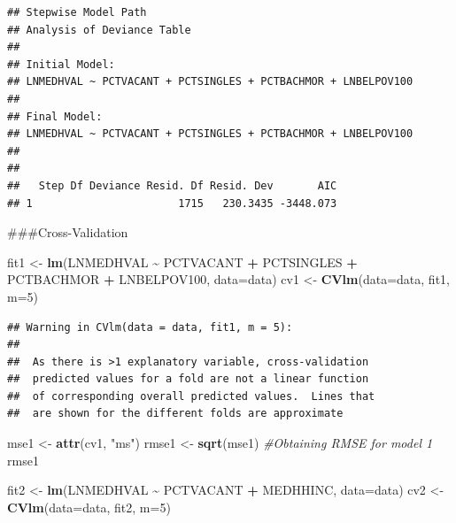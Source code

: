 \documentclass[
]{article}
\newenvironment{Shaded}{\begin{snugshade}}{\end{snugshade}}
\newcommand{\AttributeTok}[1]{\textcolor[rgb]{0.13,0.29,0.53}{#1}}
\newcommand{\CommentTok}[1]{\textcolor[rgb]{0.56,0.35,0.01}{\textit{#1}}}
\newcommand{\DecValTok}[1]{\textcolor[rgb]{0.00,0.00,0.81}{#1}}
\newcommand{\FunctionTok}[1]{\textcolor[rgb]{0.13,0.29,0.53}{\textbf{#1}}}
\newcommand{\NormalTok}[1]{#1}
\newcommand{\OtherTok}[1]{\textcolor[rgb]{0.56,0.35,0.01}{#1}}
\newcommand{\SpecialCharTok}[1]{\textcolor[rgb]{0.81,0.36,0.00}{\textbf{#1}}}
\newcommand{\StringTok}[1]{\textcolor[rgb]{0.31,0.60,0.02}{#1}}
\begin{document}
\begin{verbatim}
## Stepwise Model Path 
## Analysis of Deviance Table
## 
## Initial Model:
## LNMEDHVAL ~ PCTVACANT + PCTSINGLES + PCTBACHMOR + LNBELPOV100
## 
## Final Model:
## LNMEDHVAL ~ PCTVACANT + PCTSINGLES + PCTBACHMOR + LNBELPOV100
## 
## 
##   Step Df Deviance Resid. Df Resid. Dev       AIC
## 1                       1715   230.3435 -3448.073
\end{verbatim}

\#\#\#Cross-Validation

\begin{Shaded}
\begin{Highlighting}[]
\NormalTok{fit1 }\OtherTok{\textless{}{-}} \FunctionTok{lm}\NormalTok{(LNMEDHVAL }\SpecialCharTok{\textasciitilde{}}\NormalTok{ PCTVACANT }\SpecialCharTok{+}\NormalTok{ PCTSINGLES }\SpecialCharTok{+}\NormalTok{ PCTBACHMOR }\SpecialCharTok{+}\NormalTok{ LNBELPOV100, }\AttributeTok{data=}\NormalTok{data)}
\NormalTok{cv1 }\OtherTok{\textless{}{-}} \FunctionTok{CVlm}\NormalTok{(}\AttributeTok{data=}\NormalTok{data, fit1, }\AttributeTok{m=}\DecValTok{5}\NormalTok{)}
\end{Highlighting}
\end{Shaded}

\begin{verbatim}
## Warning in CVlm(data = data, fit1, m = 5): 
## 
##  As there is >1 explanatory variable, cross-validation
##  predicted values for a fold are not a linear function
##  of corresponding overall predicted values.  Lines that
##  are shown for the different folds are approximate
\end{verbatim}

\begin{Shaded}
\begin{Highlighting}[]
\NormalTok{mse1 }\OtherTok{\textless{}{-}} \FunctionTok{attr}\NormalTok{(cv1, }\StringTok{"ms"}\NormalTok{)}
\NormalTok{rmse1 }\OtherTok{\textless{}{-}} \FunctionTok{sqrt}\NormalTok{(mse1)                       }\CommentTok{\#Obtaining RMSE for model 1}
\NormalTok{rmse1}

\NormalTok{fit2 }\OtherTok{\textless{}{-}} \FunctionTok{lm}\NormalTok{(LNMEDHVAL }\SpecialCharTok{\textasciitilde{}}\NormalTok{ PCTVACANT }\SpecialCharTok{+}\NormalTok{ MEDHHINC, }\AttributeTok{data=}\NormalTok{data)}
\NormalTok{cv2 }\OtherTok{\textless{}{-}} \FunctionTok{CVlm}\NormalTok{(}\AttributeTok{data=}\NormalTok{data, fit2, }\AttributeTok{m=}\DecValTok{5}\NormalTok{)}
\end{Highlighting}
\end{Shaded}
\end{document}
